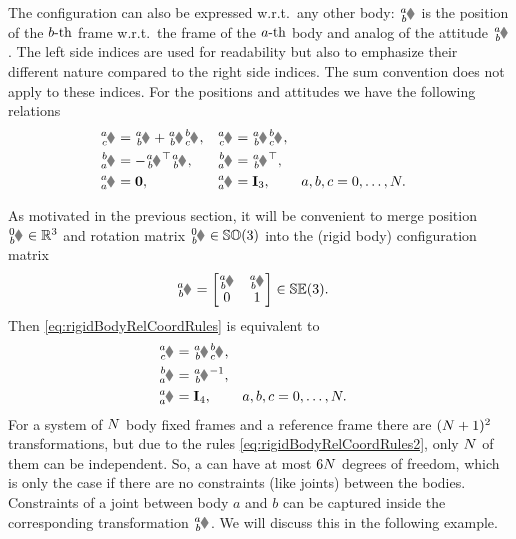 The configuration can also be expressed w.r.t.\ any other body: $\bodyPos{\BidxI}{\BidxII}$ is the position of the $b\text{-th}$ frame w.r.t.\ the frame of the $a\text{-th}$ body and analog of the attitude $\bodyRot{\BidxI}{\BidxII}$.
The left side indices are used for readability but also to emphasize their different nature compared to the right side indices.
The sum convention does not apply to these indices.
For the positions and attitudes we have the following relations
\begin{subequations}\label{eq:rigidBodyRelCoordRules}
\begin{align}
 \bodyPos{\BidxI}{\BidxIII} &= \bodyPos{\BidxI}{\BidxII} + \bodyRot{\BidxI}{\BidxII} \bodyPos{\BidxII}{\BidxIII},&
 \bodyRot{\BidxI}{\BidxIII} &= \bodyRot{\BidxI}{\BidxII} \bodyRot{\BidxII}{\BidxIII},
\\
 \bodyPos{\BidxII}{\BidxI} &= -\bodyRot{\BidxI}{\BidxII}^\top \bodyPos{\BidxI}{\BidxII},&
 \bodyRot{\BidxII}{\BidxI} &= \bodyRot{\BidxI}{\BidxII}^\top,&
\\
 \bodyPos{\BidxI}{\BidxI} &= \tuple{0},&
 \bodyRot{\BidxI}{\BidxI} &= \idMat[3],&
 \BidxI, \BidxII, \BidxIII &= 0,\ldots,\numRigidBodies.
\end{align}
\end{subequations}

As motivated in the previous section, it will be convenient to merge position $\bodyPos{0}{\BidxII} \in \RealNum^3$ and rotation matrix $\bodyRot{0}{\BidxII} \in \SpecialOrthogonalGroup(3)$ into the (rigid body) configuration matrix
\begin{align}
 \bodyHomoCoord{\BidxI}{\BidxII}{}{} &= \begin{bmatrix} \bodyRot{\BidxI}{\BidxII} & \bodyPos{\BidxI}{\BidxII}{} \\ 0 & 1 \end{bmatrix} \in \SpecialEuclideanGroup(3).
\end{align}
Then \eqref{eq:rigidBodyRelCoordRules} is equivalent to
\begin{subequations}\label{eq:rigidBodyRelCoordRules2}
\begin{align}
 \bodyHomoCoord{\BidxI}{\BidxIII} &= \bodyHomoCoord{\BidxI}{\BidxII} \bodyHomoCoord{\BidxII}{\BidxIII},
\\
 \bodyHomoCoord{\BidxII}{\BidxI} &= \bodyHomoCoord{\BidxI}{\BidxII}^{-1},
 \\
 \bodyHomoCoord{\BidxI}{\BidxI} &= \idMat[4],&
 \BidxI, \BidxII, \BidxIII &= 0,\ldots,\numRigidBodies.
\end{align}
\end{subequations}
For a system of $N$ body fixed frames and a reference frame there are $(N+1)^2$ transformations, but due to the rules \eqref{eq:rigidBodyRelCoordRules2}, only $N$ of them can be independent.
So, a \RBS can have at most $6N$ degrees of freedom, which is only the case if there are no constraints (like joints) between the bodies.
Constraints of a joint between body $a$ and $b$ can be captured inside the corresponding transformation $\bodyHomoCoord{\BidxI}{\BidxII}{}{}$.
We will discuss this in the following example.

